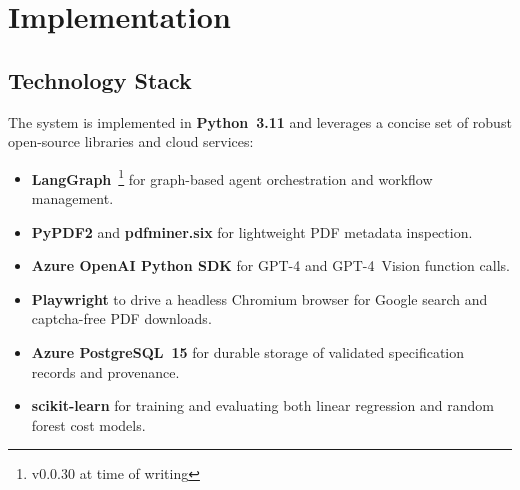 \chapter{Implementation}
\label{chapter:implementation}

\section{Technology Stack}
The system is implemented in \textbf{Python~3.11} and leverages a concise set of robust open-source libraries and cloud services:
\begin{itemize}
  \item \textbf{LangGraph}~\footnote{v0.0.30 at time of writing} for graph-based agent orchestration and workflow management.
  \item \textbf{PyPDF2} and \textbf{pdfminer.six} for lightweight PDF metadata inspection.
  \item \textbf{Azure OpenAI Python SDK} for GPT-4 and GPT-4~Vision function calls.
  \item \textbf{Playwright} to drive a headless Chromium browser for Google search and captcha-free PDF downloads.
  \item \textbf{Azure PostgreSQL~15} for durable storage of validated specification records and provenance.
  \item \textbf{scikit-learn} for training and evaluating both linear regression and random forest cost models.
\end{itemize}

